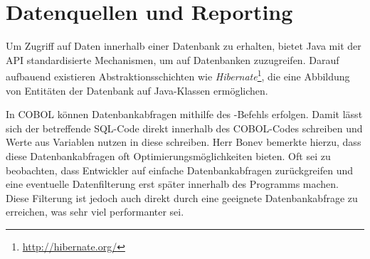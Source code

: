 \section{Datenquellen und Reporting}\label{reporting}


Um Zugriff auf Daten innerhalb einer Datenbank zu erhalten, bietet Java mit der  API standardisierte Mechanismen, um auf Datenbanken zuzugreifen. Darauf aufbauend existieren Abstraktionsschichten wie \textit{Hibernate}\footnote{\url{http://hibernate.org/}}, die eine Abbildung von Entitäten der Datenbank auf Java-Klassen ermöglichen.

In COBOL können Datenbankabfragen mithilfe des -Befehls erfolgen. Damit lässt sich der betreffende SQL-Code direkt innerhalb des COBOL-Codes schreiben und Werte aus Variablen nutzen \bzw in diese schreiben. Herr Bonev bemerkte hierzu, dass diese Datenbankabfragen oft Optimierungsmöglichkeiten bieten. Oft sei zu beobachten, dass Entwickler auf einfache Datenbankabfragen zurückgreifen und eine eventuelle Datenfilterung erst später innerhalb des Programms machen. Diese Filterung ist jedoch auch direkt durch eine geeignete Datenbankabfrage zu erreichen, was sehr viel performanter sei. 

